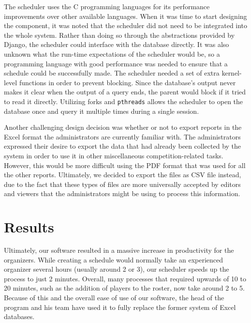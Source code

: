 \documentclass[sigconf]{acmart}
\begin{document}
The scheduler uses the C programming languages for its performance improvements over other available languages. When it was time to start designing the component, it was noted that the scheduler did not need to be integrated into the whole system. Rather than doing so through the abstractions provided by Django, the scheduler could interface with the database directly.
It was also unknown what the run-time expectations of the scheduler would be, so a programming language with good performance was needed to ensure that a schedule could be successfully made.
The scheduler needed a set of extra kernel-level functions in order to prevent blocking. Since the database's output never makes it clear when the output of a query ends, the parent would block if it tried to read it directly. Utilizing forks and \texttt{pthreads} allows the scheduler to open the database once and query it multiple times during a single session.

Another challenging design decision was whether or not to export reports in the Excel format the administrators are currently familiar with. The administrators expressed their desire to export the data that had already been collected by the system in order to use it in other miscellaneous competition-related tasks. However, this would be more difficult using the PDF format that was used for all the other reports. Ultimately, we decided to export the files as CSV file instead, due to the fact that these types of files are more universally accepted by editors and viewers that the administrators might be using to process this information.

\section{Results}%
Ultimately, our software resulted in a massive increase in productivity for the organizers. While creating a schedule would normally take an experienced organizer several hours (usually around 2 or 3), our scheduler speeds up the process to just 2 minutes. Overall, many processes that required upwards of 10 to 20 minutes, such as the addition of players to the roster, now take around 2 to 5. Because of this and the overall ease of use of our software, the head of the program and his team have used it to fully replace the former system of Excel databases. 
  
\end{document}
